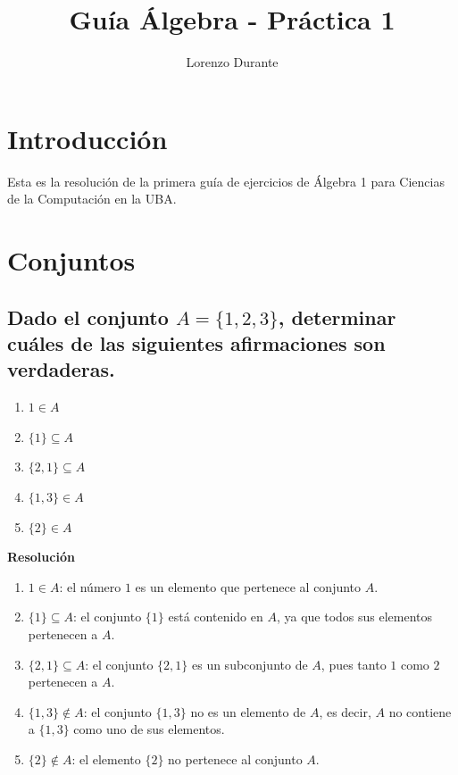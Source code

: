 \documentclass[11pt]{article}
\title{\textbf{Guía Álgebra - Práctica 1}}
\author{Lorenzo Durante}
\date{}
\begin{document}
\maketitle

\section{Introducción}
Esta es la resolución de la primera guía de ejercicios de Álgebra 1 para Ciencias de la Computación en la UBA.

\section{Conjuntos}
\subsection{Dado el conjunto \(A = \{ 1, 2, 3\}\), determinar cuáles de las siguientes afirmaciones son verdaderas.}

\begin{enumerate}[label=\roman*)]
    \item \(1 \in A\)
    \item \(\{1\} \subseteq A\)
    \item \(\{2,1\} \subseteq A\)
    \item \(\{1,3\} \in A\)
    \item \(\{2\} \in A\)
\end{enumerate}

\textbf{Resolución}

\begin{enumerate}[label=\roman*)]
    \item \(1 \in A\): el número \(1\) es un elemento que pertenece al conjunto \(A\).
    
    \item \(\{1\} \subseteq A\): el conjunto \(\{1\}\) está contenido en \(A\), ya que todos sus elementos pertenecen a \(A\).
    
    \item \(\{2,1\} \subseteq A\): el conjunto \(\{2,1\}\) es un subconjunto de \(A\), pues tanto \(1\) como \(2\) pertenecen a \(A\).
    
    \item \(\{1,3\} \notin A\): el conjunto \(\{1,3\}\) no es un elemento de \(A\), es decir, \(A\) no contiene a \(\{1,3\}\) como uno de sus elementos.
    
    \item \(\{2\} \notin A\): el elemento \(\{2\}\) no pertenece al conjunto \(A\). 
\end{enumerate}
\end{document}
